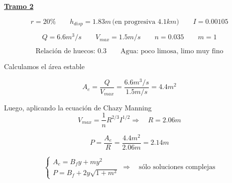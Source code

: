 \underline{\bf Tramo 2}

\begin{equation*}
  r = 20\%
 \qquad
  h_{disp} = 1.83 m \,\text{(en progresiva }4.1 km \text{)}
 \qquad
  I = 0.00105
\end{equation*}

\begin{equation*}
  Q = 6.6 m^3/s
 \qquad
  V_{max} = 1.5 m/s
 \qquad
  n = 0.035
 \qquad
  m = 1
\end{equation*}

\begin{equation*}
  \text{Relación de huecos: 0.3}
  \qquad
  \text{Agua: poco limosa, limo muy fino}
\end{equation*}

Calculamos el área estable

\begin{equation*}
 A_{e} = \dfrac{Q}{V_{max}} = \dfrac{6.6 m^3/s}{1.5 m/s} = 4.4 m^2
\end{equation*}

Luego, aplicando la ecuación de Chazy Manning
\begin{equation*}
 V_{max} =  \frac{1}{n} R^{2/3} I^{1/2}
 \Longrightarrow \quad
 R = 2.06 m
\end{equation*}

\begin{equation*}
 P = \dfrac{A_{e}}{R} = \dfrac{4.4 m^2}{2.06 m} = 2.14 m
\end{equation*}

\begin{equation*}
  \begin{cases}
    A_e = B_{f}y + m y^{2} \\
    P = B_{f} + 2 y \sqrt{1 + m^{2}}
  \end{cases}
  \Longrightarrow \quad
  \text{sólo soluciones complejas}
\end{equation*}
